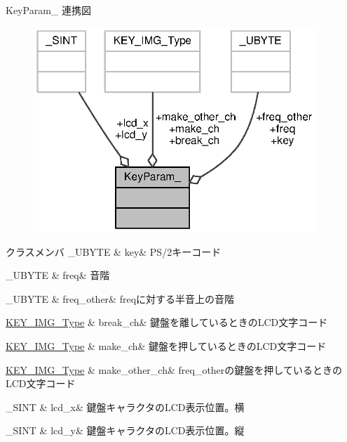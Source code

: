 Key\+Param\+\_\+ 連携図\nopagebreak
\begin{figure}[H]
\begin{center}
\leavevmode
\includegraphics[width=301pt]{dc/d6a/structKeyParam____coll__graph}
\end{center}
\end{figure}
\begin{DoxyFields}{クラスメンバ}
\+\_\+\+U\+B\+Y\+T\+E\label{synthesizer_8h_aee8e36a4a011ca2f16a1a0a1516177b8}
&
key&
P\+S/2キーコード \\
\hline

\+\_\+\+U\+B\+Y\+T\+E\label{synthesizer_8h_a9b51a65e62e596a079f5b200691cf94a}
&
freq&
音階 \\
\hline

\+\_\+\+U\+B\+Y\+T\+E\label{synthesizer_8h_a08775d991d20219f3056ae8e0cb6caf7}
&
freq\+\_\+other&
freqに対する半音上の音階 \\
\hline

\hyperlink{key__image_8h_ac00361390d99656f240e21132bd160cc_ac00361390d99656f240e21132bd160cc}{K\+E\+Y\+\_\+\+I\+M\+G\+\_\+\+Type}\label{synthesizer_8h_a2e4c7a16f352538a2fdb4f57936fe221}
&
break\+\_\+ch&
鍵盤を離しているときの\+L\+C\+D文字コード \\
\hline

\hyperlink{key__image_8h_ac00361390d99656f240e21132bd160cc_ac00361390d99656f240e21132bd160cc}{K\+E\+Y\+\_\+\+I\+M\+G\+\_\+\+Type}\label{synthesizer_8h_aab13bbb06742a3558c2047a514e1c6cf}
&
make\+\_\+ch&
鍵盤を押しているときの\+L\+C\+D文字コード \\
\hline

\hyperlink{key__image_8h_ac00361390d99656f240e21132bd160cc_ac00361390d99656f240e21132bd160cc}{K\+E\+Y\+\_\+\+I\+M\+G\+\_\+\+Type}\label{synthesizer_8h_ad82ec53dd29248caebeb83963d51a51a}
&
make\+\_\+other\+\_\+ch&
freq\+\_\+otherの鍵盤を押しているときの\+L\+C\+D文字コード \\
\hline

\+\_\+\+S\+I\+N\+T\label{synthesizer_8h_a884f9d4a3e53da8107c46d8894f37d75}
&
lcd\+\_\+x&
鍵盤キャラクタの\+L\+C\+D表示位置。横 \\
\hline

\+\_\+\+S\+I\+N\+T\label{synthesizer_8h_a6d6cf94e828c520b3bab9eb0e580c5b4}
&
lcd\+\_\+y&
鍵盤キャラクタの\+L\+C\+D表示位置。縦 \\
\hline

\end{DoxyFields}


